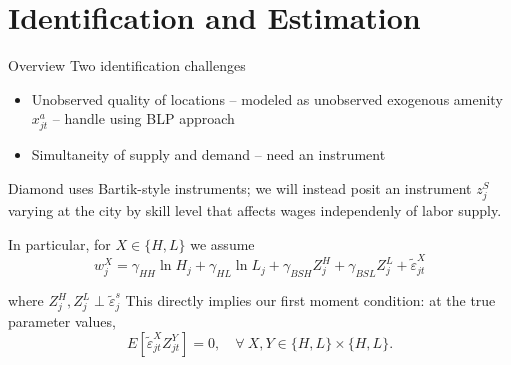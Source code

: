 \documentclass{beamer}
\begin{document}
\section{Identification and Estimation}






 \begin{frame}{Overview}
Two identification challenges
\begin{itemize}
    \item Unobserved quality of locations -- modeled as unobserved exogenous amenity $x_{jt}^a$ -- handle using BLP approach
    \item Simultaneity of supply and demand -- need an instrument
    \end{itemize}
Diamond uses Bartik-style instruments; we will instead posit an instrument $z_j^S$ varying at the city by skill level that affects wages independenly of labor supply. 

In particular, for $ X \in\{H,L\}$ we assume 
 $$ w_{j}^X = \gamma_{HH}  \ln H_{j} + \gamma_{HL} \ln L_{j}+\gamma_{BSH} Z_{j}^H  + \gamma_{BSL} Z_{j}^L + \tilde{\varepsilon}_{jt}^X
 $$

where $Z^H_j, Z^L_j \perp \tilde{\varepsilon}_{j}^s$
This directly implies our first moment condition: at the true parameter values,  
$$E[\tilde\varepsilon_{jt}^X  Z_{jt}^Y]=0, \quad \forall\: X,Y \in \{H,L\} \times \{H,L\}.$$ 

\end{frame}
\end{document}
